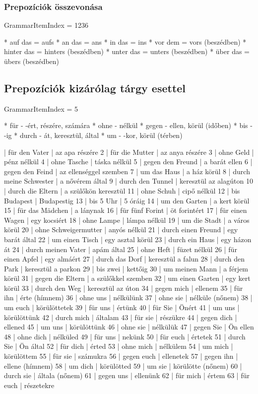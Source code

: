 \documentclass{article}
\newenvironment{desc}{\verbatim}{\endverbatim}
\newenvironment{exmp}{\verbatim}{\endverbatim}
\begin{document}
\subsubsection{Prepozíciók összevonása}

GrammarItemIndex = 1236

\begin{desc}
* auf das = aufs
* an das = ans
* in das = ins
* vor dem = vors (beszédben)
* hinter das = hinters (beszédben)
* unter das = unters (beszédben)
* über das = übers (beszédben)
\end{desc}

\subsection{Prepozíciók kizárólag tárgy esettel}

GrammarItemIndex = 5

\begin{desc}
* für - -ért, részére, számára
* ohne - nélkül
* gegen - ellen, körül (időben)
* bis - -ig
* durch - át, keresztül, által
* um - -kor, körül (térben)
\end{desc}

\begin{exmp}
1 | für den Vater | az apa részére
2 | für die Mutter | az anya részére
3 | ohne Geld | pénz nélkül
4 | ohne Tasche | táska nélkül
5 | gegen den Freund | a barát ellen
6 | gegen den Feind | az ellenséggel szemben
7 | um das Haus | a ház körül
8 | durch meine Schwester | a nővérem által
9 | durch den Tunnel | keresztül az alagúton
10 | durch die Eltern | a szülőkön keresztül
11 | ohne Schuh | cipő nélkül
12 | bis Budapest | Budapestig
13 | bis 5 Uhr | 5 óráig
14 | um den Garten | a kert körül
15 | für das Mädchen | a lánynak
16 | für fünf Forint | öt forintért
17 | für einen Wagen | egy kocsiért
18 | ohne Lampe | lámpa nélkül
19 | um die Stadt | a város körül
20 | ohne Schweigermutter | anyós nélkül
21 | durch einen Freund | egy barát által
22 | um einen Tisch | egy asztal körül
23 | durch ein Haus | egy házon át
24 | durch meinen Vater | apám által
25 | ohne Heft | füzet nélkül
26 | für einen Apfel | egy almáért
27 | durch das Dorf | keresztül a falun
28 | durch den Park | keresztül a parkon
29 | bis zwei | kettőig
30 | um meinen Mann | a férjem körül
31 | gegen die Eltern | a szülőkkel szemben
32 | um einen Garten | egy kert körül
33 | durch den Weg | keresztül az úton
34 | gegen mich | ellenem
35 | für ihn | érte (hímnem)
36 | ohne uns | nélkülünk
37 | ohne sie | nélküle (nőnem)
38 | um euch | körülöttetek
39 | für uns | értünk
40 | für Sie | Önért
41 | um uns | körülöttünk
42 | durch mich | általam
43 | für sie | részükre
44 | gegen dich | ellened
45 | um uns | körülöttünk
46 | ohne sie | nélkülük
47 | gegen Sie | Ön ellen
48 | ohne dich | nélküled
49 | für uns | nekünk
50 | für euch | értetek
51 | durch Sie | Ön által
52 | für dich | érted
53 | ohne mich | nélkülem
54 | um mich | körülöttem
55 | für sie | számukra
56 | gegen euch | ellenetek
57 | gegen ihn | ellene (hímnem)
58 | um dich | körülötted
59 | um sie | körülötte (nőnem)
60 | durch sie | általa (nőnem)
61 | gegen uns | ellenünk
62 | für mich | értem
63 | für euch | részetekre
\end{exmp}
\end{document}
